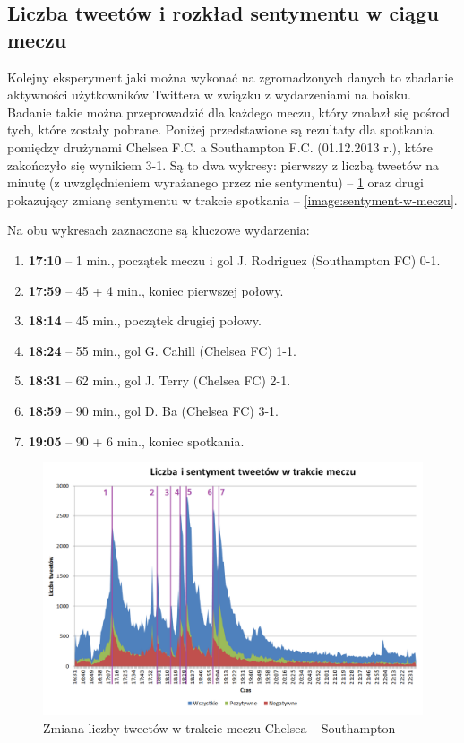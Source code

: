 \subsection{Liczba tweetów i rozkład sentymentu w ciągu meczu}
\label{subsection:aktywnoscwmeczu}
Kolejny eksperyment jaki można wykonać na zgromadzonych danych
to zbadanie aktywności użytkowników Twittera w związku z wydarzeniami 
na boisku. Badanie takie można przeprowadzić dla każdego meczu, który znalazł 
się pośrod tych, które zostały pobrane. Poniżej przedstawione są rezultaty
dla spotkania pomiędzy drużynami Chelsea F.C. a Southampton F.C. (01.12.2013 r.),
które zakończyło się wynikiem 3-1. Są to dwa wykresy: pierwszy z liczbą tweetów
na minutę (z uwzględnieniem wyrażanego przez nie sentymentu) -- 
\ref{image:tweety-w-meczu} oraz drugi pokazujący zmianę sentymentu w trakcie
spotkania -- \ref{image:sentyment-w-meczu}.

Na obu wykresach zaznaczone są kluczowe wydarzenia:

\begin{enumerate}
  \item \textbf{17:10} -- 1 min., początek meczu i gol J. Rodriguez (Southampton FC) 0-1.
  \item \textbf{17:59} -- 45 + 4 min., koniec pierwszej połowy.
  \item \textbf{18:14} -- 45 min., początek drugiej połowy.
  \item \textbf{18:24} -- 55 min., gol G. Cahill (Chelsea FC) 1-1.
  \item \textbf{18:31} -- 62 min., gol J. Terry (Chelsea FC) 2-1.
  \item \textbf{18:59} -- 90 min., gol D. Ba (Chelsea FC) 3-1.
  \item \textbf{19:05} -- 90 + 6 min., koniec spotkania.
\end{enumerate}



\begin{figure}[ht!]
\centering
\includegraphics[width=160mm]{img/tweety-w-meczu-nums.png}
\caption{Zmiana liczby tweetów w trakcie meczu Chelsea -- Southampton}
\label{image:tweety-w-meczu}
\end{figure}

